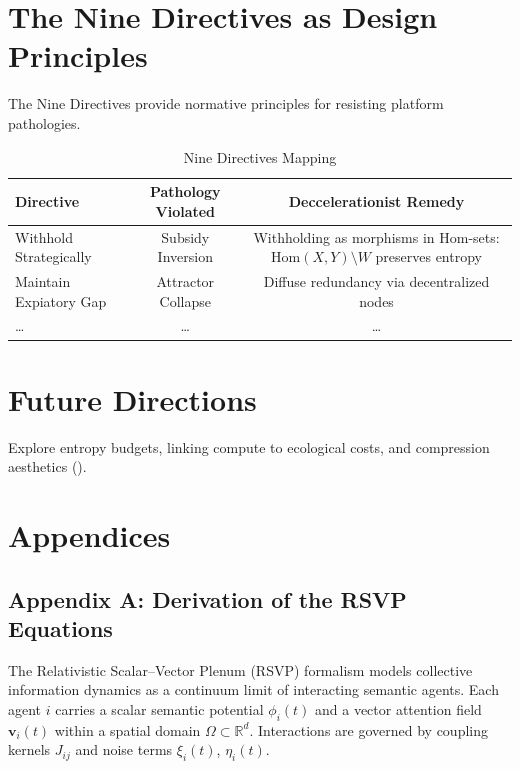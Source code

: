 \documentclass[12pt]{article}
\begin{document}
\section{The Nine Directives as Design Principles}

The Nine Directives provide normative principles for resisting platform pathologies.

\begin{table}[h]
\caption{Nine Directives Mapping}
\begin{center}
\begin{tabular}{lcc}
\toprule
Directive & Pathology Violated & Deccelerationist Remedy \\
\midrule
Withhold Strategically & Subsidy Inversion & Withholding as morphisms in Hom-sets: \(\text{Hom}(X,Y) \setminus W\) preserves entropy \\
Maintain Expiatory Gap & Attractor Collapse & Diffuse redundancy via decentralized nodes \\
\ldots & \ldots & \ldots \\
\bottomrule
\end{tabular}
\end{center}
\label{tab:directives}
\end{table}

\section{Future Directions}

Explore entropy budgets, linking compute to ecological costs, and compression aesthetics (\citealp{Feenberg1999}).

\section*{Appendices}

\subsection*{Appendix A: Derivation of the RSVP Equations}

The Relativistic Scalar–Vector Plenum (RSVP) formalism models collective information dynamics as a continuum limit of interacting semantic agents. Each agent \(i\) carries a scalar semantic potential \(\phi_i(t)\) and a vector attention field \(\mathbf{v}_i(t)\) within a spatial domain \(\Omega \subset \mathbb{R}^d\). Interactions are governed by coupling kernels \(J_{ij}\) and noise terms \(\xi_i(t)\), \(\eta_i(t)\).
\end{document}
